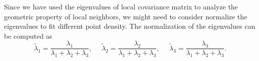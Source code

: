 Since we have used the eigenvalues of local covariance matrix to analyze the geometric property of local neighbors, we might need to consider normalize the eigenvalues to fit different point density. The normalization of the eigenvalues can be computed as 
\begin{equation}
    \tilde{\lambda}_1 = \frac{\lambda_1}{\lambda_1 + \lambda_2 +\lambda_3}, ~~~~~~\tilde{\lambda}_2 = \frac{\lambda_2}{\lambda_1 + \lambda_2 +\lambda_3}, ~~~~~~\tilde{\lambda}_3 = \frac{\lambda_3}{\lambda_1 + \lambda_2 +\lambda_3}.
\end{equation}

















